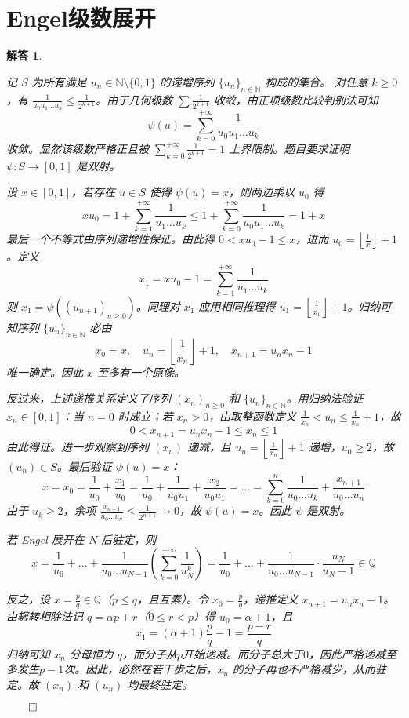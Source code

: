 \documentclass[12pt,UTF8]{ctexbook}
\theoremstyle{exercisestyle}
\theoremstyle{solutionstyle}
\newtheorem*{solution*}{解答}
\newenvironment{solution}
  {\begin{solution*}}
  {\hfill\ensuremath{\qed}\end{solution*}}
\begin{document}
\section{Engel级数展开}
\begin{solution}
\begin{subquestions}
  \item 
  记 $S$ 为所有满足 $u_n \in \mathbb{N}\setminus\{0,1\}$ 的递增序列 $\{u_n\}_{n\in\mathbb{N}}$ 构成的集合。  
  对任意 $k \geq 0$，有 $\frac{1}{u_0 u_1 \dots u_k} \leq \frac{1}{2^{k+1}}$。由于几何级数 $\sum \frac{1}{2^{k+1}}$ 收敛，由正项级数比较判别法可知  
  $$
  \psi(u) = \sum_{k=0}^{+\infty} \frac{1}{u_0 u_1 \dots u_k}
  $$
  收敛。显然该级数严格正且被 $\sum_{k=0}^{+\infty} \frac{1}{2^{k+1}} = 1$ 上界限制。题目要求证明 $\psi: S \to [0,1]$ 是双射。

  设 $x \in [0,1]$，若存在 $u \in S$ 使得 $\psi(u) = x$，则两边乘以 $u_0$ 得  
  $$
  x u_0 = 1 + \sum_{k=1}^{+\infty} \frac{1}{u_1 \dots u_k} \leq 1 + \sum_{k=0}^{+\infty} \frac{1}{u_0 u_1 \dots u_k} = 1 + x
  $$
  最后一个不等式由序列递增性保证。由此得 $0 < x u_0 - 1 \leq x$，进而 $u_0 = \left\lfloor \frac{1}{x} \right\rfloor + 1$。定义  
  $$
  x_1 = x u_0 - 1 = \sum_{k=1}^{+\infty} \frac{1}{u_1 \dots u_k}
  $$
  则 $x_1 = \psi((u_{n+1})_{n\geqslant 0})$。同理对 $x_1$ 应用相同推理得 $u_1 = \left\lfloor \frac{1}{x_1} \right\rfloor + 1$。归纳可知序列 $\{u_n\}_{n\in\mathbb{N}}$ 必由  
  $$
  x_0 = x,\quad u_n = \left\lfloor \frac{1}{x_n} \right\rfloor + 1,\quad x_{n+1} = u_n x_n - 1
  $$
  唯一确定。因此 $x$ 至多有一个原像。

  反过来，上述递推关系定义了序列 $(x_n)_{n\geqslant 0}$ 和 $\{u_n\}_{n\in\mathbb{N}}$。用归纳法验证 $x_n \in [0,1]$：当 $n=0$ 时成立；若 $x_n > 0$，由取整函数定义 $\frac{1}{x_n} < u_n \leq \frac{1}{x_n} + 1$，故  
  $$
  0 < x_{n+1} = u_n x_n - 1 \leq x_n \leq 1
  $$
  由此得证。进一步观察到序列 $(x_n)$ 递减，且 $u_n = \left\lfloor \frac{1}{x_n} \right\rfloor + 1$ 递增，$u_0 \geq 2$，故 $(u_n) \in S$。最后验证 $\psi(u) = x$：  
  $$
  x = x_0 = \frac{1}{u_0} + \frac{x_1}{u_0} = \frac{1}{u_0} + \frac{1}{u_0 u_1} + \frac{x_2}{u_0 u_1} = \dots = \sum_{k=0}^n \frac{1}{u_0 \dots u_k} + \frac{x_{n+1}}{u_0 \dots u_n}
  $$
  由于 $u_k \geq 2$，余项 $\frac{x_{n+1}}{u_0 \dots u_n} \leq \frac{1}{2^{n+1}} \to 0$，故 $\psi(u) = x$。因此 $\psi$ 是双射。

  \item 
  若 Engel 展开在 $N$ 后驻定，则  
  $$
  x = \frac{1}{u_0} + \dots + \frac{1}{u_0 \dots u_{N-1}} \left( \sum_{k=0}^{+\infty} \frac{1}{u_N^k} \right) = \frac{1}{u_0} + \dots + \frac{1}{u_0 \dots u_{N-1}} \cdot \frac{u_N}{u_N - 1} \in \mathbb{Q}
  $$
  
  反之，设 $x = \frac{p}{q} \in \mathbb{Q}$（$p \leq q$，且互素）。令 $x_0 = \frac{p}{q}$，递推定义 $x_{n+1} = u_n x_n - 1$。由辗转相除法记 $q = \alpha p + r$（$0 \leq r < p$）得 $u_0 = \alpha + 1$，且  
  $$
  x_1 = (\alpha + 1)\frac{p}{q} - 1 = \frac{p - r}{q}
  $$
  归纳可知 $x_n$ 分母恒为 $q$，而分子从$p$开始递减。而分子总大于$0$，因此严格递减至多发生$p-1$次。因此，必然在若干步之后，$x_n$ 的分子再也不严格减少，从而驻定。故 $(x_n)$ 和 $(u_n)$ 均最终驻定。  
\end{subquestions}
\end{solution}
\end{document}
